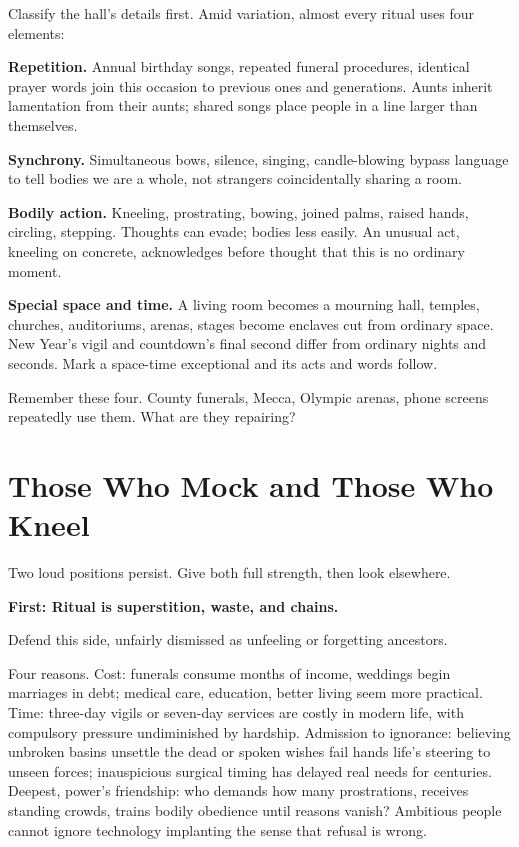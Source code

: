 Classify the hall's details first. Amid variation, almost every ritual uses four elements:

\textbf{Repetition.} Annual birthday songs, repeated funeral procedures, identical prayer words join this occasion to previous ones and generations. Aunts inherit lamentation from their aunts; shared songs place people in a line larger than themselves.

\textbf{Synchrony.} Simultaneous bows, silence, singing, candle-blowing bypass language to tell bodies we are a whole, not strangers coincidentally sharing a room.

\textbf{Bodily action.} Kneeling, prostrating, bowing, joined palms, raised hands, circling, stepping. Thoughts can evade; bodies less easily. An unusual act, kneeling on concrete, acknowledges before thought that this is no ordinary moment.

\textbf{Special space and time.} A living room becomes a mourning hall, temples, churches, auditoriums, arenas, stages become enclaves cut from ordinary space. New Year's vigil and countdown's final second differ from ordinary nights and seconds. Mark a space-time exceptional and its acts and words follow.

Remember these four. County funerals, Mecca, Olympic arenas, phone screens repeatedly use them. What are they repairing?

\section{Those Who Mock and Those Who Kneel}
Two loud positions persist. Give both full strength, then look elsewhere.

\textbf{First: Ritual is superstition, waste, and chains.}

Defend this side, unfairly dismissed as unfeeling or forgetting ancestors.

Four reasons. Cost: funerals consume months of income, weddings begin marriages in debt; medical care, education, better living seem more practical. Time: three-day vigils or seven-day services are costly in modern life, with compulsory pressure undiminished by hardship. Admission to ignorance: believing unbroken basins unsettle the dead or spoken wishes fail hands life's steering to unseen forces; inauspicious surgical timing has delayed real needs for centuries. Deepest, power's friendship: who demands how many prostrations, receives standing crowds, trains bodily obedience until reasons vanish? Ambitious people cannot ignore technology implanting the sense that refusal is wrong.

